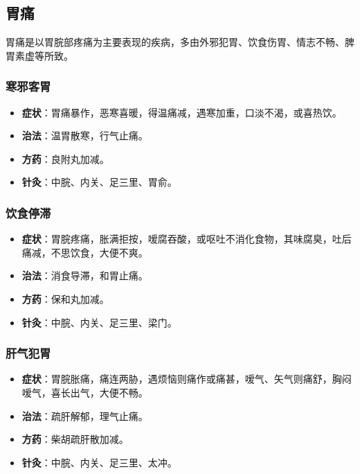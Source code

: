\documentclass[12pt,UTF8]{ctexbook}
\begin{document}
\subsection{胃痛}

胃痛是以胃脘部疼痛为主要表现的疾病，多由外邪犯胃、饮食伤胃、情志不畅、脾胃素虚等所致。

\subsubsection{寒邪客胃}

\begin{itemize}
\item \textbf{症状}：胃痛暴作，恶寒喜暖，得温痛减，遇寒加重，口淡不渴，或喜热饮。
\item \textbf{治法}：温胃散寒，行气止痛。
\item \textbf{方药}：良附丸加减。
\item \textbf{针灸}：中脘、内关、足三里、胃俞。
\end{itemize}

\subsubsection{饮食停滞}

\begin{itemize}
\item \textbf{症状}：胃脘疼痛，胀满拒按，嗳腐吞酸，或呕吐不消化食物，其味腐臭，吐后痛减，不思饮食，大便不爽。
\item \textbf{治法}：消食导滞，和胃止痛。
\item \textbf{方药}：保和丸加减。
\item \textbf{针灸}：中脘、内关、足三里、梁门。
\end{itemize}

\subsubsection{肝气犯胃}

\begin{itemize}
\item \textbf{症状}：胃脘胀痛，痛连两胁，遇烦恼则痛作或痛甚，嗳气、矢气则痛舒，胸闷嗳气，喜长出气，大便不畅。
\item \textbf{治法}：疏肝解郁，理气止痛。
\item \textbf{方药}：柴胡疏肝散加减。
\item \textbf{针灸}：中脘、内关、足三里、太冲。
\end{itemize}
\end{document}
